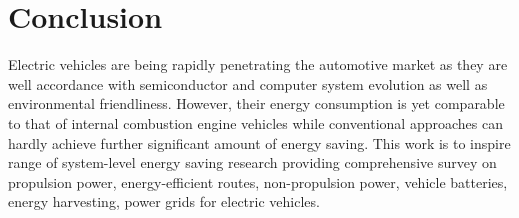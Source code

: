 
\section{Conclusion}

Electric vehicles are being rapidly penetrating the automotive market as they are well accordance with semiconductor and computer system evolution as well as environmental friendliness. However, their energy consumption is yet comparable to that of internal combustion engine vehicles while conventional approaches can hardly achieve further significant amount of energy saving. This work is to inspire range of system-level energy saving research providing comprehensive survey on propulsion power, energy-efficient routes, non-propulsion power, vehicle batteries, energy harvesting, power grids for electric vehicles. 



